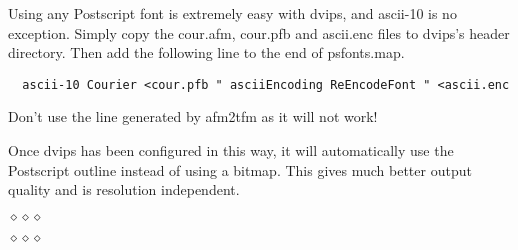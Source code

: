 Using any Postscript font is extremely easy with {\sc dvips}, and
{\sc ascii-10} is no exception.
Simply copy the {\sc cour.afm}, {\sc cour.pfb} and {\sc ascii.enc} files to
{\sc dvips's} header directory. Then add the following line to the end of
{\sc psfonts.map}.
\begin{verbatim}
  ascii-10 Courier <cour.pfb " asciiEncoding ReEncodeFont " <ascii.enc
\end{verbatim}
Don't use the line generated by {\sc afm2tfm} as it will not work!

Once {\sc dvips} has been configured in this way, it will automatically use
the Postscript outline instead of using a bitmap. This gives much better
output quality and is resolution independent.

\begin{center}
$\diamond\diamond\diamond$
\end{center}






\begin{center}
$\diamond\diamond\diamond$
\end{center}


